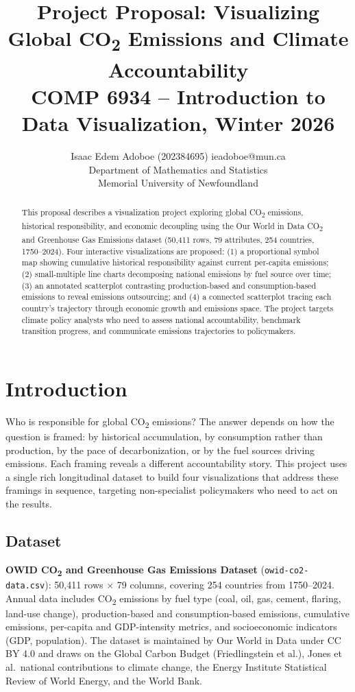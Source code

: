 \documentclass[10pt]{article}
\title{Project Proposal: Visualizing Global CO\textsubscript{2} Emissions and Climate Accountability\\
\large COMP 6934 -- Introduction to Data Visualization, Winter 2026}
\author{\name Isaac Edem Adoboe (202384695) \email ieadoboe@mun.ca \\
      \addr Department of Mathematics and Statistics\\
      Memorial University of Newfoundland}
\begin{document}
\maketitle

\begin{abstract}
This proposal describes a visualization project exploring global CO\textsubscript{2} emissions, historical responsibility, and economic decoupling using the Our World in Data CO\textsubscript{2} and Greenhouse Gas Emissions dataset (50{,}411 rows, 79 attributes, 254 countries, 1750--2024). Four interactive visualizations are proposed: (1) a proportional symbol map showing cumulative historical responsibility against current per-capita emissions; (2) small-multiple line charts decomposing national emissions by fuel source over time; (3) an annotated scatterplot contrasting production-based and consumption-based emissions to reveal emissions outsourcing; and (4) a connected scatterplot tracing each country's trajectory through economic growth and emissions space. The project targets climate policy analysts who need to assess national accountability, benchmark transition progress, and communicate emissions trajectories to policymakers.
\end{abstract}

\section{Introduction}
\label{sec:intro}

Who is responsible for global CO\textsubscript{2} emissions? The answer depends on how the question is framed: by historical accumulation, by consumption rather than production, by the pace of decarbonization, or by the fuel sources driving emissions. Each framing reveals a different accountability story. This project uses a single rich longitudinal dataset to build four visualizations that address these framings in sequence, targeting non-specialist policymakers who need to act on the results.

\subsection{Dataset}

\textbf{OWID CO\textsubscript{2} and Greenhouse Gas Emissions Dataset} (\texttt{owid-co2-data.csv}): 50{,}411 rows $\times$ 79 columns, covering 254 countries from 1750--2024. Annual data includes CO\textsubscript{2} emissions by fuel type (coal, oil, gas, cement, flaring, land-use change), production-based and consumption-based emissions, cumulative emissions, per-capita and GDP-intensity metrics, and socioeconomic indicators (GDP, population). The dataset is maintained by Our World in Data under CC BY 4.0 and draws on the Global Carbon Budget (Friedlingstein et al.), Jones et al.\ national contributions to climate change, the Energy Institute Statistical Review of World Energy, and the World Bank.
\end{document}
